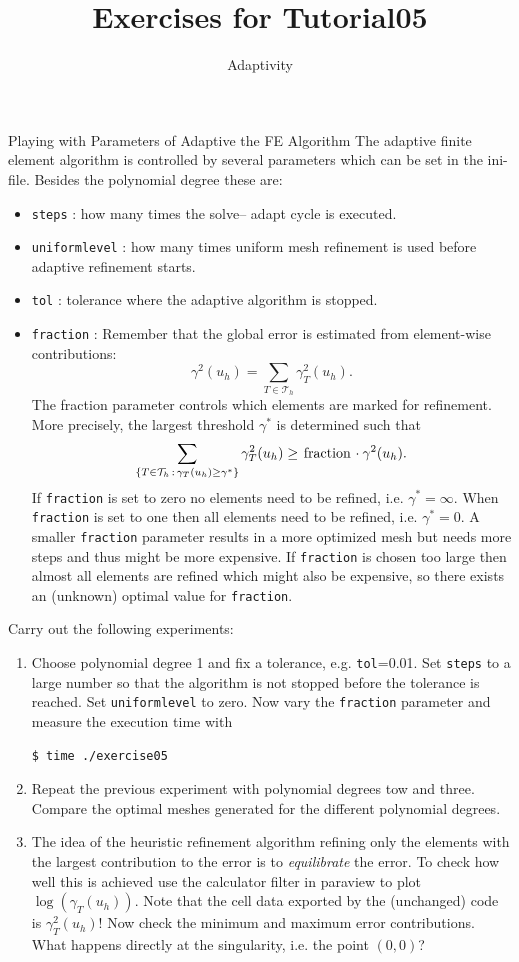 \documentclass[12pt,a4paper]{article}
\title{\textbf{Exercises for Tutorial05}}
\subtitle{Adaptivity}
\begin{document}
\exerciseheader

\begin{Exercise}{Playing with Parameters of Adaptive the FE Algorithm}
The adaptive finite element algorithm is controlled by several parameters
which can be set in the ini-file.
Besides the polynomial degree these are:
\begin{itemize}
\item \lstinline{steps} : how many times the solve-- adapt cycle is executed.
\item \lstinline{uniformlevel} : how many times uniform mesh refinement is used before
adaptive refinement starts.
\item \lstinline{tol} : tolerance where the adaptive algorithm is stopped.
\item \lstinline{fraction} : Remember that the global error is estimated from element-wise
contributions: $$\gamma^2(u_h) = \sum_{T\in \mathcal{T}_h} \gamma_T^2(u_h).$$
The fraction parameter controls which elements are marked for refinement. More precisely,
the largest threshold $\gamma^\ast$ is determined such that 
$$\sum_{\{T\in\mathcal{T}_h \,:\, \gamma_T(u_h)\geq\gamma^\ast\}} \gamma_T^2(u_h) 
\geq \text{\lstinline{fraction}} \cdot \gamma^2(u_h). $$
If \lstinline{fraction} is set to zero no elements need to be refined, i.e. $\gamma^\ast=\infty$.
When \lstinline{fraction} is set to one then all elements need to be refined, i.e. $\gamma^\ast=0$.
A smaller \lstinline{fraction} parameter results in a more optimized mesh but needs more steps
and thus might be more expensive. If \lstinline{fraction} is chosen too large then almost
all elements are refined which might also be expensive, so there exists an (unknown) optimal
value for \lstinline{fraction}.
\end{itemize}
Carry out the following experiments:
\begin{enumerate}
\item Choose polynomial degree 1 and fix a tolerance, e.g. \lstinline{tol}=0.01. 
Set \lstinline{steps} to a large number so that the algorithm is not stopped before the
tolerance is reached. Set \lstinline{uniformlevel} to zero. Now vary the \lstinline{fraction} parameter
and measure the execution time with
\begin{lstlisting}[basicstyle=\ttfamily\small,
frame=single,
backgroundcolor=\color{listingbg}]
$ time ./exercise05
\end{lstlisting}
\item Repeat the previous experiment with polynomial degrees tow and three. Compare the optimal
meshes generated for the different polynomial degrees.
\item The idea of the heuristic refinement algorithm refining only the elements with the
largest contribution to the error is to \textit{equilibrate} the error. To check how well this
is achieved use the calculator filter in paraview to plot $\log(\gamma_T(u_h))$. Note that
the cell data exported by the (unchanged) code is $\gamma_T^2(u_h)$! Now check
the minimum and maximum error contributions. What happens directly at the singularity,
i.e. the point $(0,0)$?
\end{enumerate}
\end{Exercise}
\end{document}
